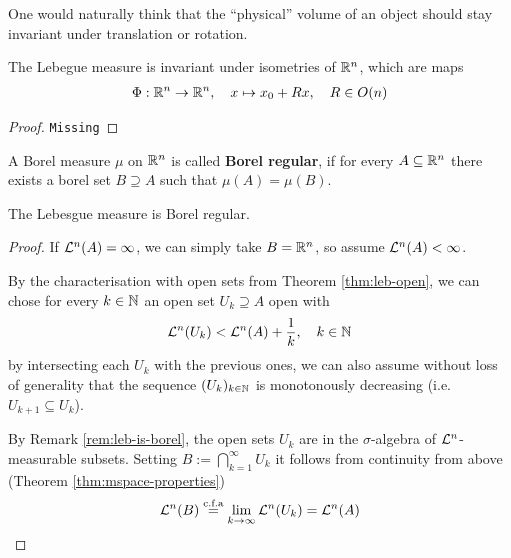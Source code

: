 One would naturally think that the ``physical'' volume of an object should stay invariant under translation or rotation.

\begin{thm}[]
  The Lebegue measure is invariant under isometries of $\mathbb{R}^{n}$, which are maps
  \begin{align*}
    \Phi: \mathbb{R}^{n} \to \mathbb{R}^{n}, \quad x \mapsto x_0 + Rx, \quad R \in O(n)
  \end{align*}
\end{thm}
\begin{proof}
  \texttt{Missing}
\end{proof}


\begin{dfn}[]
  A Borel measure $\mu$ on $\mathbb{R}^{n}$ is called \textbf{Borel regular}, if for every $A \subseteq \mathbb{R}^{n}$ there exists a borel set $B \supseteq A$ such that $\mu(A) = \mu(B)$.
\end{dfn}

\begin{lem}[]
  The Lebesgue measure is Borel regular.
\end{lem}
\begin{proof}
  If $\mathcal{L}^{n}(A) = \infty$, we can simply take $B =  \mathbb{R}^{n}$, so assume $\mathcal{L}^{n}(A) < \infty$.

  By the characterisation with open sets from Theorem \ref{thm:leb-open}, we can chose for every $k \in \mathbb{N}$ an open set $U_k \supseteq A$ open with
  \begin{align*}
    \mathcal{L}^{n}(U_k) < \mathcal{L}^{n}(A) +  \frac{1}{k}, \quad k \in \mathbb{N}
  \end{align*}
  by intersecting each $U_k$ with the previous ones, 
  we can also assume without loss of generality that the sequence $(U_k)_{k \in \mathbb{N}}$ is monotonously decreasing (i.e. $U_{k+1} \subseteq U_k$).

  By Remark \ref{rem:leb-is-borel}, the open sets $U_k$ are in the $\sigma$-algebra of $\mathcal{L}^{n}$-measurable subsets.
  Setting $B := \bigcap_{k=1}^{\infty}U_k$ it follows from continuity from above (Theorem \ref{thm:mspace-properties})
  \begin{align*}
    \mathcal{L}^{n}(B) \stackrel{\text{c.f.a}}{=} \lim_{k \to \infty} \mathcal{L}^{n}(U_k) = \mathcal{L}^{n}(A)
  \end{align*}
\end{proof}


